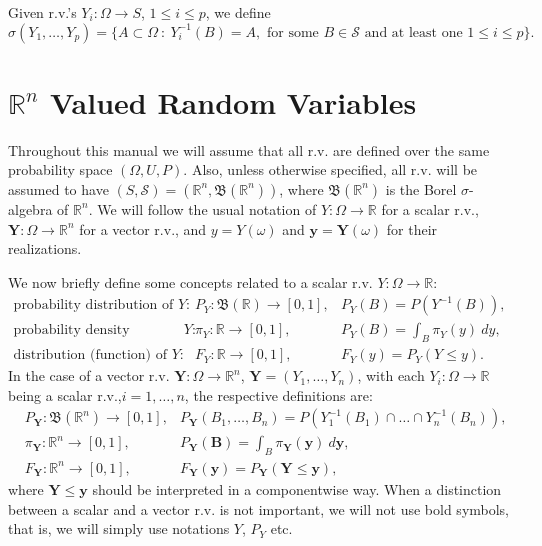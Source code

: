 Given r.v.'s $Y_i:\Omega\rightarrow S$, $1\leqslant i\leqslant p$, we define
\begin{equation*}
\sigma(Y_1,\ldots,Y_p) = \{A\subset\Omega~:~Y_i^{-1}(B)=A,\text{ for some }B\in\mathcal{S}\text{ and at least one }1\leqslant i\leqslant p\}.
\end{equation*}

\section{$\mathbb{R}^n$ Valued Random Variables}

Throughout this manual we will assume that all r.v. are defined over the same probability space $(\Omega,U,P)$.
Also, unless otherwise specified, all r.v. will be assumed to have
$(S,\mathcal{S})=(\mathbb{R}^n,\mathfrak{B}(\mathbb{R}^n))$,
where $\mathfrak{B}(\mathbb{R}^n)$ is the Borel $\sigma$-algebra of $\mathbb{R}^n$.
We will follow the usual notation of
$Y:\Omega\rightarrow\mathbb{R}$ for a scalar r.v.,
$\mathbf{Y}:\Omega\rightarrow\mathbb{R}^n$ for a vector r.v.,
and $y=Y(\omega)$ and $\mathbf{y}=\mathbf{Y}(\omega)$ for their realizations.

We now briefly define some concepts related to a scalar r.v. $Y:\Omega\rightarrow\mathbb{R}$:
\begin{eqnarray*}
\text{probability distribution of }                      Y: & P_Y:  \mathfrak{B}(\mathbb{R})\rightarrow [0,1], & P_Y(B) = P(Y^{-1}(B)),       \\
\text{probability density (function), if it exists, of } Y: & \pi_Y:             \mathbb{R} \rightarrow [0,1], & P_Y(B) = \int_B \pi_Y(y)~dy, \\
\text{distribution (function) of }                       Y: & F_Y:               \mathbb{R} \rightarrow [0,1], & F_Y(y) = P_Y(Y\leqslant y).
\end{eqnarray*}
In the case of a vector r.v. $\mathbf{Y}:\Omega\rightarrow\mathbb{R}^n$, $\mathbf{Y}=(Y_1,\ldots,Y_n)$,
with each $Y_i:\Omega\rightarrow\mathbb{R}$ being a scalar r.v.,$i=1,\ldots,n$, the respective definitions are:
\begin{eqnarray*}
 & P_{\mathbf{Y}}:  \mathfrak{B}(\mathbb{R}^n)\rightarrow [0,1], & P_{\mathbf{Y}}(B_1,\ldots,B_n) = P(Y_1^{-1}(B_1)\cap\ldots\cap Y_n^{-1}(B_n)), \\
 & \pi_{\mathbf{Y}}:             \mathbb{R}^n \rightarrow [0,1], & P_{\mathbf{Y}}(\mathbf{B}) = \int_B \pi_{\mathbf{Y}}(\mathbf{y})~d\mathbf{y}, \\
 & F_{\mathbf{Y}}:               \mathbb{R}^n \rightarrow [0,1], & F_{\mathbf{Y}}(\mathbf{y}) = P_{\mathbf{Y}}(\mathbf{Y}\leqslant\mathbf{y}),
\end{eqnarray*}
where $\mathbf{Y}\leqslant\mathbf{y}$ should be interpreted in a componentwise way.
When a distinction between a scalar and a vector r.v. is not important, we will not use bold symbols, that is, we will simply use notations $Y$, $P_Y$ etc.

